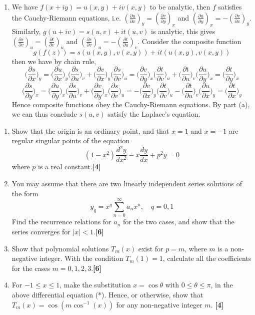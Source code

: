 \documentclass[a4paper]{article}
\begin{document}
\begin{ans}
\begin{enumerate}[label=(\alph*)]
\begin{enumerate}[label=(\roman*)]
\item We have $f(x+iy)=u(x,y)+iv(x,y)$ to be analytic, then $f$ satisfies the Cauchy-Riemann equations, i.e. $(\frac{\partial u}{\partial x})_y=(\frac{\partial v}{\partial y})_x$ and $(\frac{\partial u}{\partial y})_x=-(\frac{\partial v}{\partial x})_y$. Similarly, $g(u+iv)=s(u,v)+it(u,v)$ is analytic, this gives $(\frac{\partial s}{\partial v})_u=(\frac{\partial t}{\partial v})_u$ and $(\frac{\partial s}{\partial v})_u=-(\frac{\partial t}{\partial u})_v$. Consider the composite function
$$g(f(z))=s(u(x,y),v(x,y))+it(u(x,y),v(x,y))$$
then we have by chain rule,
$$\bigg(\frac{\partial s}{\partial x}\bigg)_y=\bigg(\frac{\partial u}{\partial x}\bigg)_y\bigg(\frac{\partial s}{\partial u}\bigg)_v+\bigg(\frac{\partial v}{\partial x}\bigg)_y\bigg(\frac{\partial s}{\partial v}\bigg)_u=\bigg(\frac{\partial v}{\partial y}\bigg)_x\bigg(\frac{\partial t}{\partial v}\bigg)_u+\bigg(\frac{\partial t}{\partial u}\bigg)_v\bigg(\frac{\partial u}{\partial y}\bigg)_x=\bigg(\frac{\partial t}{\partial y}\bigg)_x$$
$$\bigg(\frac{\partial s}{\partial y}\bigg)_x=\bigg(\frac{\partial u}{\partial y}\bigg)_x\bigg(\frac{\partial s}{\partial u}\bigg)_v+\bigg(\frac{\partial v}{\partial y}\bigg)_x\bigg(\frac{\partial s}{\partial v}\bigg)_u=-\bigg(\frac{\partial v}{\partial x}\bigg)_y\bigg(\frac{\partial t}{\partial v}\bigg)_u-\bigg(\frac{\partial t}{\partial u}\bigg)_v\bigg(\frac{\partial u}{\partial x}\bigg)_y=\bigg(\frac{\partial t}{\partial x}\bigg)_y$$
Hence composite functions obey the Cauchy-Riemann equations. By part (a), we can thus conclude $s(u,v)$ satisfy the Laplace's equation.
\end{enumerate}
\end{enumerate}
\end{ans}
\newpage
\begin{qns}\leavevmode
\begin{enumerate}[label=(\alph*)]
    \item Show that the origin is an ordinary point, and that $x=1$ and $x=-1$ are regular singular points of the equation
\begin{equation}
(1-x^2)\frac{d^2y}{dx^2}-x\frac{dy}{dx}+p^2y=0\tag{*}
\end{equation}
where $p$ is a real constant.\hfill \textbf{[4]}
\item You may assume that there are two linearly independent series solutions of the form $$y_q=x^q\sum_{n=0}^\infty a_nx^n, \quad q=0,1$$
Find the recurrence relations for $a_n$ for the two cases, and show that the series converges for $|x|<1$.\hfill \textbf{[6]}
\item Show that polynomial solutions $T_m(x)$ exist for $p=m$, where $m$ is a non-negative integer. With the condition $T_m(1)=1$, calculate all the coefficients for the cases $m=0,1,2,3$.\hfill \textbf{[6]}
\item For $-1\leq x\leq 1$, make the substitution $x=\cos\theta$ with $0\leq\theta\leq\pi$, in the above differential equation (*). Hence, or otherwise, show that $T_m(x)=\cos(m\cos^{-1}(x))$ for any non-negative integer $m$. \hfill \textbf{[4]}
\end{enumerate}
\end{qns}
\end{document}
